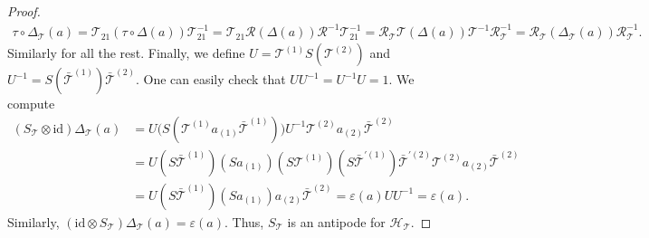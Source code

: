 \documentclass[10pt,a4paper]{amsart}
\begin{document}
\begin{proof}
\begin{equation}
\begin{split}
            \tau \circ \Delta_\mathcal{T} (a) = \mathcal{T}_{21} (\tau \circ\Delta(a))\mathcal{T}_{21}^{-1} = \mathcal{T}_{21}\mathcal{R}(\Delta(a))\mathcal{R}^{-1} \mathcal{T}_{21}^{-1} = \mathcal{R}_\mathcal{T}\mathcal{T}(\Delta(a))\mathcal{T}^{-1}\mathcal{R}_\mathcal{T}^{-1} = \mathcal{R}_\mathcal{T}(\Delta_\mathcal{T}(a))\mathcal{R}_\mathcal{T}^{-1}.
        \end{split}
    \end{equation}
    Similarly for all the rest. Finally, we define $U=\mathcal{T}^{(1)} S\left(\mathcal{T}^{(2)}\right)$ and $U^{-1}=S\left(\bar{\mathcal{T}}^{(1)}\right) \bar{\mathcal{T}}^{(2)}$. One can easily check that $UU^{-1}=U^{-1}U=1$. We compute
    \begin{equation}
\begin{split}
 (S_{\mathcal{T}}\otimes \textrm{id})\Delta_{\mathcal{T}}(a)
&= U\bigl(S(\mathcal{T}^{(1)}a_{(1)}\bar{\mathcal{T}}^{(1)})\bigr)U^{-1}
   \mathcal{T}^{(2)}a_{(2)}\bar{\mathcal{T}}^{(2)} \\
&= U(S \bar{\mathcal{T}}^{(1)} )(S a_{(1)})(S\mathcal{T}^{(1)})
   (S\bar{\mathcal{T}}^{\prime(1)})\bar{\mathcal{T}}^{\prime(2)}
   \mathcal{T}^{(2)}a_{(2)}\bar{\mathcal{T}}^{(2)} \\
&= U(S \bar{\mathcal{T}}^{(1)}) (S a_{(1)}) a_{(2)} \bar{\mathcal{T}}^{(2)}
   = \varepsilon(a) U U^{-1} = \varepsilon(a).
\end{split}
\end{equation}
Similarly, $(\textrm{id}\otimes S_{\mathcal{T}})\Delta_{\mathcal{T}}(a)
=\varepsilon(a)$. Thus, $S_\mathcal{T}$ is an antipode for $\mathscr{H}_\mathcal{T}$.
\end{proof}
\end{document}
